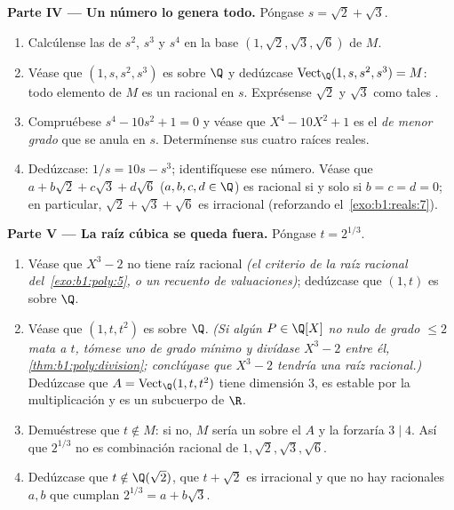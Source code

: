 \begin{problem}
\medskip
\noindent\textbf{Parte IV --- Un número lo genera todo.}
Póngase $s = \sqrt2 + \sqrt3$.
\begin{enumerate}[resume]
  \item Calcúlense las  de $s^2$, $s^3$ y $s^4$ en la
        base $(1, \sqrt2, \sqrt3, \sqrt6)$ de $M$.
  \item Véase que $(1, s, s^2, s^3)$ es  sobre $\Q$ y dedúzcase
        $\operatorname{Vect}_\Q(1, s, s^2, s^3) = M$: todo elemento
        de $M$ es un  racional en $s$. Exprésense $\sqrt2$
        y $\sqrt3$ como tales .
  \item Compruébese $s^4 - 10s^2 + 1 = 0$ y véase que
        $X^4 - 10X^2 + 1$ es el \emph{ de menor
        grado} que se anula en $s$. Determínense sus cuatro raíces
        reales.
  \item Dedúzcase: $1/s = 10s - s^3$; identifíquese ese número.
        Véase que $a + b\sqrt2 + c\sqrt3 + d\sqrt6$
        ($a,b,c,d \in \Q$) es racional si y solo si $b = c = d = 0$;
        en particular, $\sqrt2 + \sqrt3 + \sqrt6$ es irracional
        (reforzando el~\cref{exo:b1:reals:7}).
\end{enumerate}

\medskip
\noindent\textbf{Parte V --- La raíz cúbica se queda fuera.} Póngase
$t = 2^{1/3}$.
\begin{enumerate}[resume]
  \item Véase que $X^3 - 2$ no tiene raíz racional \emph{(el criterio
        de la raíz racional del~\cref{exo:b1:poly:5}, o un recuento
        de valuaciones)}; dedúzcase que $(1, t)$ es  sobre
        $\Q$.
  \item Véase que $(1, t, t^2)$ es  sobre $\Q$. \emph{(Si algún
        $P \in \Q[X]$ no nulo de grado $\leq 2$ mata a $t$, tómese
        uno de grado mínimo y divídase $X^3 - 2$ entre él,
        \cref{thm:b1:poly:division}; conclúyase que $X^3 - 2$
        tendría una raíz racional.)} Dedúzcase que
        $A = \operatorname{Vect}_\Q(1, t, t^2)$ tiene dimensión $3$,
        es estable por la multiplicación y es un subcuerpo de $\R$.
  \item Demuéstrese que $t \notin M$: si no, $M$ sería un
         sobre el  $A$ y la 
        forzaría $3 \mid 4$. Así que $2^{1/3}$ no es combinación
        racional de $1, \sqrt2, \sqrt3, \sqrt6$.
  \item Dedúzcase que $t \notin \Q(\sqrt2)$, que $t + \sqrt2$ es
        irracional y que no hay racionales $a, b$ que cumplan
        $2^{1/3} = a + b\sqrt3$.
\end{enumerate}


\end{problem}
